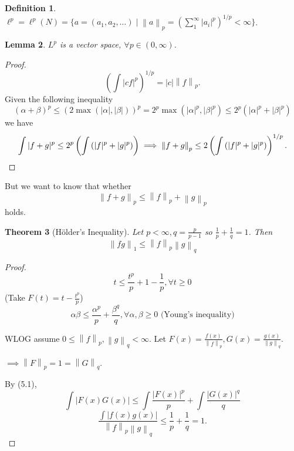 \documentclass{report}
\newcommand{\norm}[1]{\left\| #1 \right\|}
\newtheorem{theorem}{Theorem}[chapter]
\newtheorem{lemma}[theorem]{Lemma}
\theoremstyle{definition}
\newtheorem{definition}[theorem]{Definition}
\theoremstyle{remark}
\begin{document}
\begin{definition}
	$\ell^p = \ell^p(N) = \{a = (a_1, a_2, \ldots) \mid \norm{a}_p = \left(\sum_{1}^\infty |a_i|^p\right)^{1 / p} < \infty\}$.
\end{definition}

\begin{lemma}
	$L^p$ is a vector space, $\forall p \in (0, \infty)$.
\end{lemma}
\begin{proof}
	\[
		\left(\int |cf|^p\right)^{1/p} = |c|\norm{f}_p.
	\]
	Given the following inequality
	\[
		(\alpha + \beta)^p \leq (2 \max(|\alpha|, |\beta|))^p = 2^p \max\left(|\alpha|^p, |\beta|^p\right) \leq 2^p(|\alpha|^p + |\beta|^p)
	\]
	we have \[
		\int |f+g|^p \leq 2^p \left(\int \left(|f|^p + |g|^p\right)\right) \implies \norm{f + g}_p \leq 2 \left(\int \left(|f|^p + |g|^p\right)\right)^{1/p}. \qedhere
	\]
\end{proof}

But we want to know that whether \[
	\norm{f + g}_p \leq \norm{f}_p + \norm{g}_p
\] holds.

\begin{theorem}[Hölder's Inequality]
	Let $p < \infty, q = \frac{p}{p - 1}$ so $\frac{1}{p} + \frac{1}{q} = 1$. Then 
	\[
		\norm{fg}_1 \leq \norm{f}_p\norm{g}_q	
	\]
\end{theorem}
\begin{proof}
	\[
		t \leq \frac{t^p}{p} + 1 - \frac{1}{p}, \forall t \geq 0	
	\]
	(Take $F(t) = t - \frac{t^p}{p}$)
	\begin{equation}
		\alpha\beta \leq \frac{\alpha^p}{p} + \frac{\beta^q}{q}, \forall \alpha, \beta \geq 0 \text{ (Young's inequality)}
	\end{equation}
		
	WLOG assume $0 \leq \norm{f}_p, \norm{g}_q < \infty$. Let $F(x) = \frac{f(x)}{\norm{f}_p}, G(x) = \frac{g(x)}{\norm{g}_q}$.

	$\implies \norm{F}_p = 1 = \norm{G}_q$.

	By (5.1), 
	\[
		\int |F(x)G(x)| \leq \int \frac{|F(x)|^p}{p} + \int \frac{|G(x)|^q}{q}	
	\] 
	\[
		\frac{\int |f(x)g(x)|}{\norm{f}_p\norm{g}_q} \leq \frac{1}{p} + \frac{1}{q} = 1.	
	\]
\end{proof}
\end{document}
